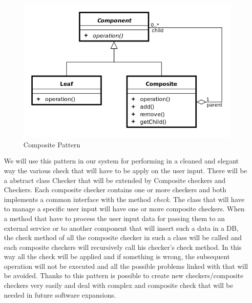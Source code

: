 \begin{figure}[H]
	\centering
	\includegraphics[scale=0.35]{Images/Patterns/Composite_Pattern}
	\caption{Composite Pattern}
\end{figure}
We will use this pattern in our system for performing in a cleaned and elegant way the various check that will have to be apply on the user input. There will be a abstract class Checker that will be extended by Composite checkers and Checkers. Each composite checker contains one or more checkers and both implements a common interface with the method \emph{check}. The class that will have to manage a specific user input will have one or more composite checkers.
When a method that have to process the user input data for passing them to an external service or to another component that will insert such a data in a DB, the check method of all the composite checker in such a class will be called and each composite checkers will recursively call his checker’s check method. In this way all the check will be applied and if something is wrong, the subsequent operation will not be executed and all the possible problems linked with that will be avoided. 
Thanks to this pattern is possible to create new checkers/composite checkers very easily and deal with complex and composite check that will be needed in future software expansions.

